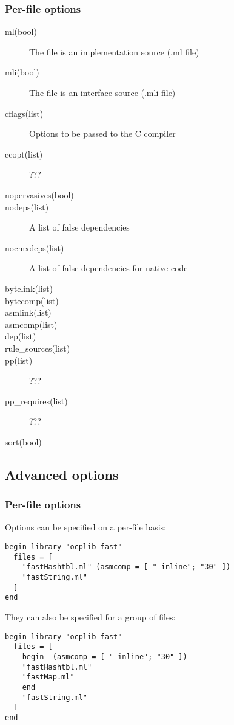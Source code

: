 \subsubsection{Per-file options}


\begin{description}
\item[ml(bool)] The file is an implementation source (.ml file)
\item[mli(bool)] The file is an interface source (.mli file)
\item[cflags(list)] Options to be passed to the C compiler
\item[ccopt(list)] ???
\item[nopervasives(bool)]
\item[nodeps(list)] A list of false dependencies
\item[nocmxdeps(list)] A list of false dependencies for native code
\item[bytelink(list)]
\item[bytecomp(list)]
\item[asmlink(list)]
\item[asmcomp(list)]
\item[dep(list)]
\item[rule\_sources(list)]
\item[pp(list)] ???
\item[pp\_requires(list)] ???
\item[sort(bool)]
\end{description}


\subsection{Advanced options}

\subsubsection{Per-file options}

Options can be specified on a per-file basis:

\begin{verbatim}
begin library "ocplib-fast"
  files = [
    "fastHashtbl.ml" (asmcomp = [ "-inline"; "30" ])
    "fastString.ml"
  ]
end
\end{verbatim}

They can also be specified for a group of files:

\begin{verbatim}
begin library "ocplib-fast"
  files = [
    begin  (asmcomp = [ "-inline"; "30" ])
    "fastHashtbl.ml"
    "fastMap.ml"
    end
    "fastString.ml"
  ]
end
\end{verbatim}


